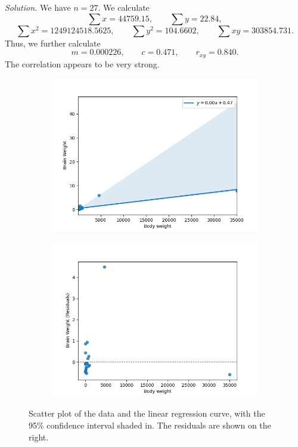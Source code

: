 \documentclass[10pt]{article}
\begin{document}
        \textit{Solution.} 
        We have $n = 27$. We calculate 
        \[
                \sum x = 44759.15, \qquad \sum y = 22.84,
        \]\[
                \sum x^2 = 1249124518.5625, \qquad \sum y^2 = 104.6602, \qquad \sum xy = 303854.731.
        \]
        Thus, we further calculate
        \[
                m = 0.000226, \qquad c = 0.471, \qquad r_{xy} = 0.840.
        \]
        The correlation appears to be very strong.
        \begin{figure}[H]
        \centering
        \begin{subfigure}[b]{0.49\textwidth}
                \includegraphics[width=\textwidth]{./10_4_1.png}
        \end{subfigure}
        \begin{subfigure}[b]{0.49\textwidth}
                \includegraphics[width=\textwidth]{./10_4_2.png}
        \end{subfigure}
        \caption{Scatter plot of the data and the linear regression curve, with the 95\% confidence interval shaded in.
        The residuals are shown on the right.}
        \label{fig:brain}
        \end{figure}
\end{document}
